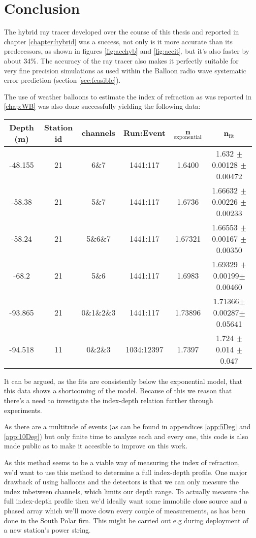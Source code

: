 \chapter*{Conclusion}
The hybrid ray tracer developed over the course of this thesis and reported in
chapter \ref{chapter:hybrid} was a success, not only is it more accurate than
its predecessors, as shown in figures \ref{fig:acchyb} and \ref{fig:accit},
 but it's also faster by about 34\%.  The accuracy of the ray tracer also
makes it perfectly suitable for very fine precision simulations as used within
the Balloon radio wave systematic error prediction (section \ref{sec:feasible}).

The use of weather balloons to estimate the index of refraction as
was reported in \ref{chap:WB} was also done successfully 
yielding the following data:
\begin{center}
\begin{tabular}{||c c c c c c||}
 \hline
 Depth (m) & Station id & channels & Run:Event & n$_\text{exponential}$ & n$_\text{fit}$\\ [0.5ex]
 \hline\hline
 -48.155 & 21 & 6\&7 & 1441:117 & 1.6400 & 1.632 $\pm$ 0.00128 $\pm$ 0.00472\\
 -58.38 & 21 & 5\&7 & 1441:117 & 1.6736 & 1.66632 $\pm$ 0.00226 $\pm$ 0.00233 \\
 -58.24 & 21 & 5\&6\&7 & 1441:117 & 1.67321 & 1.66553 $\pm$ 0.00167 $\pm$ 0.00350 \\
 -68.2 & 21 & 5\&6 & 1441:117 & 1.6983 & 1.69329 $\pm$0.00199$\pm$0.00460 \\
 -93.865 & 21 & 0\&1\&2\&3 & 1441:117 & 1.73896 & 1.71366$\pm$0.00287$\pm$0.05641\\
 -94.518 & 11 & 0\&2\&3 & 1034:12397 & 1.7397 & 1.724 $\pm$ 0.014 $\pm$ 0.047 \\
 \hline
\end{tabular}
\end{center}
It can be argued, as the fits are consistently below the exponential model,
that this data shows a shortcoming of the model.  Because of this we reason
that there's a need to investigate the index-depth relation further through 
experiments.

As there are a multitude of events (as can be found in appendices
\ref{app:5Deg} and \ref{app:10Deg}) but only finite time to analyze each and
every one, this code is also made public \cite{projects-mt} as to make
it accesible to improve on this work.  

As this method seems to be a viable way of measuring the index of refraction,
we'd want to use this method to determine a full index-depth profile. One major
drawback of using balloons and the detectors is that we can only measure
the index inbetween channels, which limits our depth range.  To actually measure the full
index-depth profile then we'd ideally want some immobile close source and a
phased array which we'll move down every couple of measurements, as has been
done in the South Polar firn\cite{kravchenko_besson_meyers_2004}.  This might
be carried out e.g during deployment of a new station's power string.
